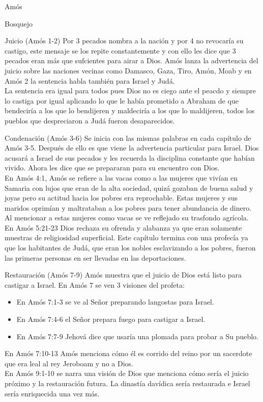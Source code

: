 \begin{section}{Amós}
	\begin{subsection}{Bosquejo}
		\begin{subsubsection}{Juicio (Amós 1-2)}
			Por 3 pecados nombra a la nación y por 4 no revocaría su castigo, este mensaje se los repite constantemente y con ello les dice que 3 pecados eran más que sufcientes para airar a Dios. Amós lanza la advertencia del juicio sobre las naciones vecinas como Damasco, Gaza, Tiro, Amón, Moab y en Amós 2 la sentencia habla también para Israel y Judá.\\
			La sentencia era igual para todos pues Dios no es ciego ante el peacdo y siempre lo castiga por igual aplicando lo que le había prometido a Abraham de que bendeciría a los que lo bendijeren y maldeciría a los que lo maldijeren, todos los pueblos que despreciaron a Judá fueron desaparecidos.
		\end{subsubsection}
		\newpage
		\begin{subsubsection}{Condenación (Amós 3-6)}
			Se inicia con las mismas palabras en cada capítulo de Amós 3-5. Después de ello es que viene la advertencia particular para Israel. Dios acusará a Israel de sus pecados y les recuerda la disciplina constante que habían vivido. Ahora les dice que se prepararan para su encuentro con Dios.\\
			En Amós 4:1, Amós se refiere a las vacas como a las mujeres que vivían en Samaria con lujos que eran de la alta sociedad, quizá gozaban de buena salud y joyas pero su actitud hacia los pobres era reprochable. Estas mujeres y sus maridos oprimían y maltrataban a los pobres para tener abundancia de dinero. Al mencionar a estas mujeres como vacas se ve reflejado su trasfondo agrícola.\\
			En Amós 5:21-23 Dios rechaza su ofrenda y alabanza ya que eran solamente muestras de religiosidad superficial. Este capítulo termina con una profecía ya que los habitantes de Judá, que eran los nobles esclavizando a los pobres, fueron las primeras personas en ser llevadas en las deportaciones.
		\end{subsubsection}
		\begin{subsubsection}{Restauración (Amós 7-9)}
			Amós muestra que el juicio de Dios está listo para castigar a Israel. En Amós 7 se ven 3 visiones del profeta:
			\begin{itemize}
				\item En Amós 7:1-3 se ve al Señor preparando langostas para Israel.
				\item En Amós 7:4-6 el Señor prepara fuego para castigar a Israel.
				\item En Amós 7:7-9 Jehová dice que usaría una plomada para probar a Su pueblo. 
		\end{itemize}
				En Amós 7:10-13 Amós menciona cómo él es corrido del reino por un sacerdote que era leal al rey Jeroboam y no a Dios.\\
			En Amós 9:1-10 se narra una visión de Dios que menciona cómo sería el juicio próximo y la restauración futura. La dinastía davídica sería restaurada e Israel sería enriquecida una vez más.\\
		\end{subsubsection}
	\end{subsection}
\end{section}
%



